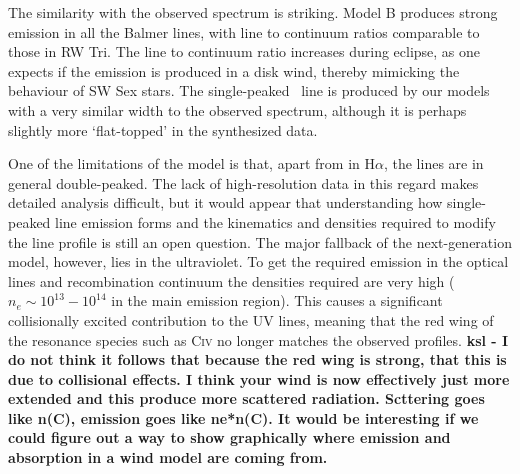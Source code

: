 \documentclass[preprint, a4paper, 11pt]{aastex}
\begin{document}
The similarity with the observed spectrum is striking. 
Model B produces strong emission in all the Balmer lines, 
with line to continuum ratios
comparable to those in RW Tri. 
The line to continuum ratio increases during eclipse,
as one expects if the emission is produced in a disk wind, 
thereby mimicking the behaviour of SW Sex stars.
The single-peaked \ha\ line is produced by our models with a 
very similar width to the observed spectrum, although it is perhaps slightly more
`flat-topped' in the synthesized data.

One of the limitations of the model is that, apart 
from in H$\alpha$, the lines are in general double-peaked. 
The lack of high-resolution data in this regard makes detailed analysis difficult,
but it would appear that understanding how single-peaked 
line emission forms and the kinematics and densities required to
modify the line profile is still an open question. 
The major fallback of the next-generation model, however, lies
in the ultraviolet. To get the required emission in the optical lines
and recombination continuum the densities required are very high 
($n_e\sim10^{13}-10^{14}$ in the main emission region).
This causes a significant collisionally excited contribution
to the UV lines, meaning that the red wing of the 
resonance species such as C\textsc{iv} no longer matches the
observed profiles. {\bf ksl - I do not think it follows that because the red wing is strong, that this is due to collisional effects.  I think your wind is now effectively just more extended and this produce more scattered radiation. Scttering goes like n(C), emission goes like ne*n(C).  It would be interesting if we could figure out a way to show graphically where emission and absorption in a wind model are coming from.}
\end{document}
